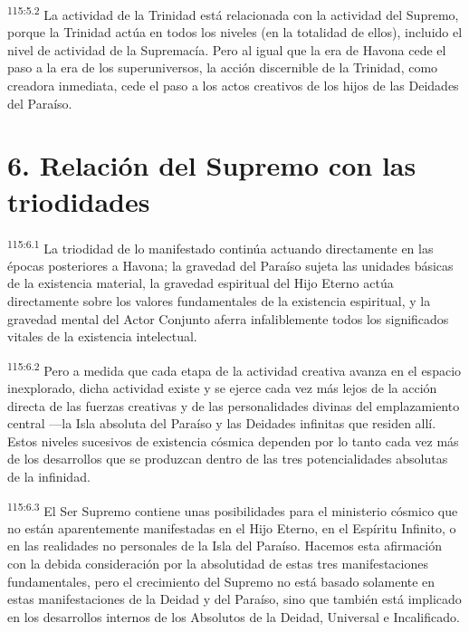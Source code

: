 \par
\textsuperscript{115:5.2} La actividad de la Trinidad está relacionada con la actividad del Supremo, porque la Trinidad actúa en todos los niveles (en la totalidad de ellos), incluido el nivel de actividad de la Supremacía. Pero al igual que la era de Havona cede el paso a la era de los superuniversos, la acción discernible de la Trinidad, como creadora inmediata, cede el paso a los actos creativos de los hijos de las Deidades del Paraíso.

\section*{6. Relación del Supremo con las triodidades}
\par
\textsuperscript{115:6.1} La triodidad de lo manifestado continúa actuando directamente en las épocas posteriores a Havona; la gravedad del Paraíso sujeta las unidades básicas de la existencia material, la gravedad espiritual del Hijo Eterno actúa directamente sobre los valores fundamentales de la existencia espiritual, y la gravedad mental del Actor Conjunto aferra infaliblemente todos los significados vitales de la existencia intelectual.

\par
\textsuperscript{115:6.2} Pero a medida que cada etapa de la actividad creativa avanza en el espacio inexplorado, dicha actividad existe y se ejerce cada vez más lejos de la acción directa de las fuerzas creativas y de las personalidades divinas del emplazamiento central ---la Isla absoluta del Paraíso y las Deidades infinitas que residen allí. Estos niveles sucesivos de existencia cósmica dependen por lo tanto cada vez más de los desarrollos que se produzcan dentro de las tres potencialidades absolutas de la infinidad.

\par
\textsuperscript{115:6.3} El Ser Supremo contiene unas posibilidades para el ministerio cósmico que no están aparentemente manifestadas en el Hijo Eterno, en el Espíritu Infinito, o en las realidades no personales de la Isla del Paraíso. Hacemos esta afirmación con la debida consideración por la absolutidad de estas tres manifestaciones fundamentales, pero el crecimiento del Supremo no está basado solamente en estas manifestaciones de la Deidad y del Paraíso, sino que también está implicado en los desarrollos internos de los Absolutos de la Deidad, Universal e Incalificado.

